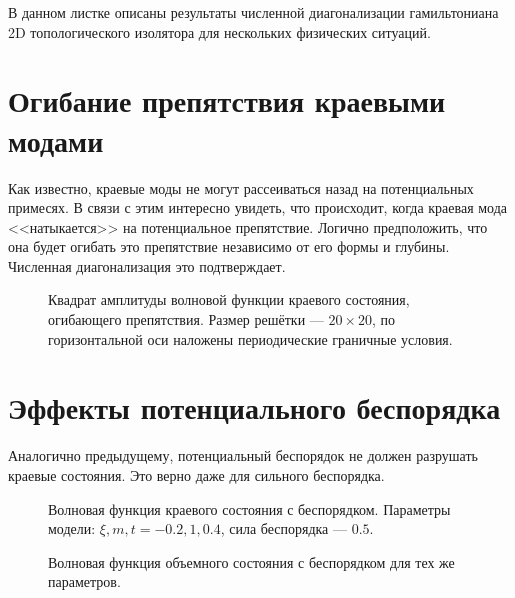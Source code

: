 В данном листке описаны результаты численной диагонализации 
гамильтониана 2D топологического изолятора для нескольких 
физических ситуаций.
\section{Огибание препятствия краевыми модами}
Как известно, краевые моды не могут рассеиваться назад на потенциальных примесях. 
В связи с этим интересно увидеть, что происходит, когда краевая мода <<натыкается>> на
потенциальное препятствие. Логично предположить, что она будет огибать это препятствие
независимо от его формы и глубины. Численная диагонализация это подтверждает.
\begin{figure}[h]
    \centering
    \begin{minipage}[h]{0.4\linewidth}
    \end{minipage}
    \hfill
    \begin{minipage}[h]{0.4\linewidth}
    \end{minipage}
    \caption{
        Квадрат амплитуды волновой функции краевого состояния, огибающего препятствия. 
        Размер решётки --- $20\times20$, по горизонтальной оси наложены периодические
        граничные условия.
    }
\end{figure}
\section{Эффекты потенциального беспорядка}
Аналогично предыдущему, потенциальный беспорядок не должен разрушать краевые состояния.
Это верно даже для сильного беспорядка.
\begin{figure}[h]
    \centering
    \begin{minipage}[h]{0.4\linewidth}
        \caption{
            Волновая функция краевого состояния с беспорядком.
            Параметры модели: $\xi, m, t = -0.2, 1, 0.4$, сила беспорядка --- $0.5$.
            }
    \end{minipage}
    \hfill
    \begin{minipage}[h]{0.4\linewidth}
        \caption{
            Волновая функция объемного состояния с беспорядком для тех же параметров.
            }
    \end{minipage}
\end{figure}

